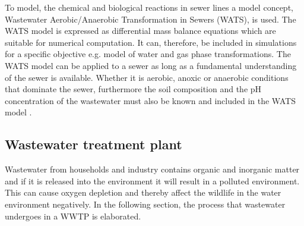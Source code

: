 To model, the chemical and biological reactions in sewer lines a model concept, Wastewater Aerobic/Anaerobic Transformation in Sewers (WATS), is used. The WATS model is expressed as differential mass balance equations which are suitable for numerical computation. It can, therefore, be included in simulations for a specific objective e.g. model of water and gas phase transformations. The WATS model can be applied to a sewer as long as a fundamental understanding of the sewer is available. Whether it is aerobic, anoxic or anaerobic conditions that dominate the sewer, furthermore the soil composition and the pH concentration of the wastewater must also be known and included in the WATS model \cite{Sewer_processes}.     





\subsection{Wastewater treatment plant}\label{subse:Wastewater treatment plant}
Wastewater from households and industry contains organic and inorganic matter and if it is released into the environment it will result in a polluted environment. This can cause oxygen depletion and thereby affect the wildlife in the water environment negatively. %
In the following section, the process that wastewater undergoes in a WWTP is elaborated. 

